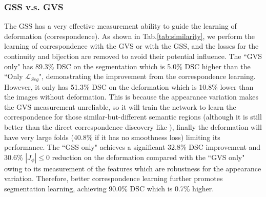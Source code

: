 \subsubsection{GSS v.s. GVS}
\begin{table}
\centering
\caption{The comparison between our GEMINI-Semi with only GSS and with only GVS on the ``T1: 3D Cardiac structures" demonstrates the advantages of our geometric semantic similarity.}


\label{tab:similarity}
\end{table}
The GSS has a very effective measurement ability to guide the learning of deformation (correspondence). As shown in Tab.\ref{tab:similarity}, we perform the learning of correspondence with the GVS or with the GSS, and the losses for the continuity and bijection are removed to avoid their potential influence. The ``GVS only" has 89.3\% DSC on the segmentation which is 5.0\% DSC higher than the ``Only $\mathcal{L}_{Seg}$", demonstrating the improvement from the correspondence learning. However, it only has 51.3\% DSC on the deformation which is 10.8\% lower than the images without deformation. This is because the appearance variation makes the GVS measurement unreliable, so it will train the network to learn the correspondence for those similar-but-different semantic regions (although it is still better than the direct correspondence discovery like \cite{li2021dense,o2020unsupervised,wang2022densecl,wang2022exploring}), finally the deformation will have very large folds (40.8\% if it has no smoothness loss) limiting its performance. The ``GSS only" achieves a significant 32.8\% DSC improvement and 30.6\% $|J_{\phi}|\leq0$ reduction on the deformation compared with the ``GVS only" owing to its measurement of the features which are robustness for the appearance variation. Therefore, better correspondence learning further promotes segmentation learning, achieving 90.0\% DSC which is 0.7\% higher.

